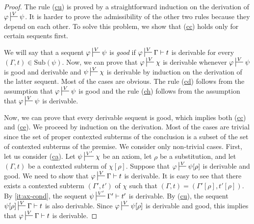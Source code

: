 \documentclass[reqno]{amsart}
\newcommand{\axref}[1]{(\hyperref[ax:#1]{#1})}
\theoremstyle{definition}
\theoremstyle{remark}
\newcommand{\fs}[1]{\mathrm{#1}}
\newcommand{\sub}{\fs{Sub}}
\numberwithin{figure}{section}
\begin{document}
\begin{proof}
The rule \axref{cu} is proved by a straightforward induction on the derivation of $\varphi \sststile{}{V} \psi$.
It is harder to prove the admissibility of the other two rules because they depend on each other.
To solve this problem, we show that \axref{cc} holds only for certain sequents first.

We will say that a sequent $\varphi \sststile{}{V} \psi$ is \emph{good} if $\varphi \sststile{}{V} \Gamma \vdash t$ is derivable for every $(\Gamma,t) \in \sub(\psi)$.
Now, we can prove that $\varphi \sststile{}{V} \chi$ is derivable whenever $\varphi \sststile{}{V} \psi$ is good and derivable and $\psi \sststile{}{V} \chi$ is derivable by induction on the derivation of the latter sequent.
Most of the cases are obvious.
The rule \axref{cd} follows from the assumption that $\varphi \sststile{}{V} \psi$ is good and the rule \axref{ch} follows from the assumption that $\varphi \sststile{}{V} \psi$ is derivable.

Now, we can prove that every derivable sequent is good, which implies both \axref{cc} and \axref{ce}.
We proceed by induction on the derivation.
Most of the cases are trivial since the set of proper contexted subterms of the conclusion is a subset of the set of contexted subterms of the premise.
We consider only non-trivial cases.
First, let us consider \axref{ca}.
Let $\psi \sststile{}{V'} \chi$ be an axiom, let $\rho$ be a substitution, and let $(\Gamma,t)$ be a contexted subterm of $\chi[\rho]$.
Suppose that $\varphi \sststile{}{V} \psi[\rho]$ is derivable and good.
We need to show that $\varphi \sststile{}{V} \Gamma \vdash t$ is derivable.
It is easy to see that there exists a contexted subterm $(\Gamma',t')$ of $\chi$ such that $(\Gamma,t) = (\Gamma'[\rho],t'[\rho])$.
By \eqref{it:ax-cond}, the sequent $\psi \sststile{}{V'} \Gamma' \vdash t'$ is derivable.
By \axref{cu}, the sequent $\psi[\rho] \sststile{}{V} \Gamma \vdash t$ is also derivable.
Since $\varphi \sststile{}{V} \psi[\rho]$ is derivable and good, this implies that $\varphi \sststile{}{V} \Gamma \vdash t$ is derivable.


\end{proof}
\end{document}
